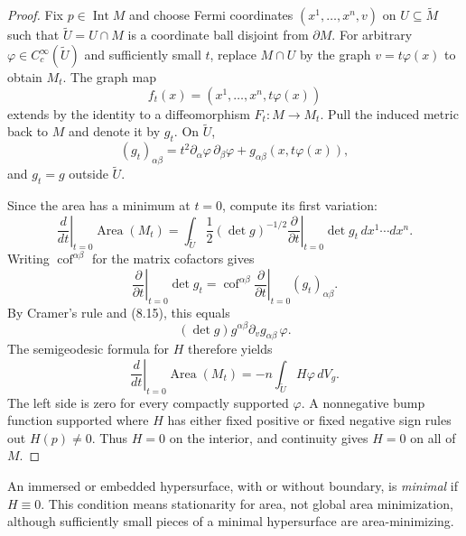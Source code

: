 \begin{proof}
\sketch Fix $p\in\operatorname{Int}M$ and choose Fermi coordinates
$(x^1,\ldots,x^n,v)$ on $U\subseteq\widetilde M$ such that
$\widetilde U=U\cap M$ is a coordinate ball disjoint from $\partial M$.
For arbitrary $\varphi\in C_c^\infty(\widetilde U)$ and sufficiently small
$t$, replace $M\cap U$ by the graph $v=t\varphi(x)$ to obtain $M_t$. The graph
map
\[
f_t(x)=(x^1,\ldots,x^n,t\varphi(x))
\]
extends by the identity to a diffeomorphism $F_t\colon M\to M_t$. Pull the
induced metric back to $M$ and denote it by $g_t$. On $\widetilde U$,
\begin{equation}
(g_t)_{\alpha\beta}
=t^2\partial_\alpha\varphi\,\partial_\beta\varphi
+g_{\alpha\beta}(x,t\varphi(x)), \tag{8.15}
\end{equation}
and $g_t=g$ outside $\widetilde U$.

Since the area has a minimum at $t=0$, compute its first variation:
\begin{equation}
\left.\frac d{dt}\right|_{t=0}\operatorname{Area}(M_t)
=\int_{\widetilde U}\frac12(\det g)^{-1/2}
 \left.\frac\partial{\partial t}\right|_{t=0}\det g_t
 \,dx^1\cdots dx^n. \tag{8.16}
\end{equation}
Writing $\operatorname{cof}^{\alpha\beta}$ for the matrix cofactors gives
\begin{equation}
\left.\frac\partial{\partial t}\right|_{t=0}\det g_t
=\operatorname{cof}^{\alpha\beta}
 \left.\frac\partial{\partial t}\right|_{t=0}(g_t)_{\alpha\beta}. \tag{8.17}
\end{equation}
By Cramer's rule and (8.15), this equals
\[
(\det g)g^{\alpha\beta}\partial_vg_{\alpha\beta}\,\varphi.
\]
The semigeodesic formula for $H$ therefore yields
\begin{equation}
\left.\frac d{dt}\right|_{t=0}\operatorname{Area}(M_t)
=-n\int_{\widetilde U}H\varphi\,dV_g. \tag{8.18}
\end{equation}
The left side is zero for every compactly supported $\varphi$. A nonnegative
bump function supported where $H$ has either fixed positive or fixed negative
sign rules out $H(p)\ne0$. Thus $H=0$ on the interior, and continuity gives
$H=0$ on all of $M$.
\end{proof}

An immersed or embedded hypersurface, with or without boundary, is
\emph{minimal} if $H\equiv0$. This condition means stationarity for area, not
global area minimization, although sufficiently small pieces of a minimal
hypersurface are area-minimizing.

